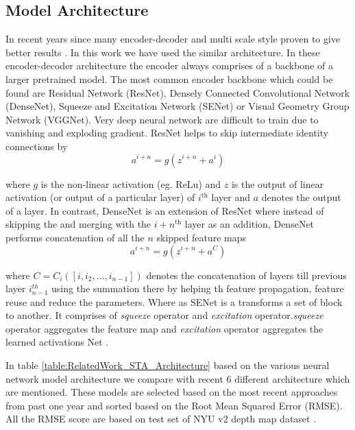 \subsection{Model Architecture}
\label{Chapter3:ModelArch}
In recent years since many encoder-decoder and multi scale style proven to give better results \cite{Alhashim2018, hu2019revisiting}. In this work we have used the similar architecture. In these encoder-decoder architecture the encoder always comprises of a backbone of a larger pretrained model. The most common encoder backbone which could be found are Residual Network (ResNet), Densely Connected Convolutional Network (DenseNet), Squeeze and Excitation Network (SENet) or Visual Geometry Group Network (VGGNet)\cite{hu2019revisiting}. Very deep neural network are difficult to train due to vanishing and exploding gradient. ResNet helps to skip intermediate identity connections by 
\begin{equation} \label{eqResNet}
    {a^{i+n}=g(z^{i+n} + a^i)}
\end{equation}


where \(g\) is the non-linear activation (eg. ReLu) and \(z\) is the output of linear activation (or output of a particular layer) of $i^{\text{th}}$ layer and \(a\) denotes the output of a layer. In contrast, DenseNet is an extension of ResNet where instead of skipping the and merging with the $i+n^{\text{th}}$ layer as an addition, DenseNet performs concatenation of all the $n$ skipped feature maps
\begin{equation} \label{eqDenseNet}
    {a^{i+n}=g(z^{i+n} + a^{C})}
\end{equation}


where \({C =C_i([i,i_2,...,i_{n-1}])}\) denotes the concatenation of layers till previous layer \(i_{n-1}^{th}\)  using the summation \cite{huang2017densely} there by helping th feature propagation, feature reuse and  reduce the parameters. Where as SENet is a transforms a set of block to another. It comprises of \textit{squeeze} operator and \textit{excitation} operator.\textit{squeeze} operator aggregates the feature map and \textit{excitation} operator  aggregates the learned activations Net \cite{iandola2016squeezenet}. 


In table \ref{table:RelatedWork_STA_Architecture} based on the various neural network model architecture we compare with recent 6 different architecture which are mentioned. These models are selected based on the most recent approaches from past one year and sorted based on the Root Mean Squared Error (RMSE). All the RMSE score are based on test set of NYU v2 depth map dataset \cite{silberman11indoor}.

